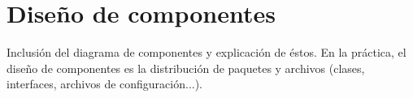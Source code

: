 \section{\forlnameref Diseño de componentes}
\label{sec:components}

\begin{shaded}
Inclusión del diagrama de componentes y explicación de éstos. En la práctica, el diseño de componentes es la distribución de paquetes y archivos (clases, interfaces, archivos de configuración...).
\end{shaded}